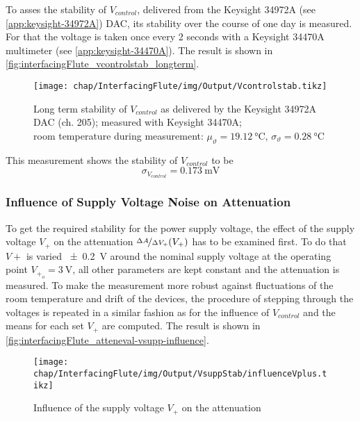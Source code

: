 To asses the stability of $V_{control}$, delivered from the Keysight 34972A (see \autoref{app:keysight-34972A}) DAC, its stability over the course of one day is measured. For that the voltage is taken once every 2 seconds with a Keysight 34470A multimeter (see \autoref{app:keysight-34470A}). The result is shown in \autoref{fig:interfacingFlute_vcontrolstab_longterm}.

\begin{figure}[tb]
	\centering
	\texttt{[image: chap/InterfacingFlute/img/Output/Vcontrolstab.tikz]}
	\caption{Long term stability of $V_{control}$ as delivered by the Keysight 34972A DAC (ch. 205); measured with Keysight 34470A;\\room temperature during measurement: $\mu_\vartheta=\SI{19.12}{\degreeCelsius}$, $\sigma_\vartheta=\SI{0.28}{\degreeCelsius}$}
	\label{fig:interfacingFlute_vcontrolstab_longterm}
\end{figure}

This measurement shows the stability of $V_{control}$ to be
\begin{equation}
\sigma_{V_{control}} = \SI{0.173}{\milli\volt}
\end{equation}

\subsubsection{Influence of Supply Voltage Noise on Attenuation}
To get the required stability for the power supply voltage, the effect of the supply voltage $V_+$ on the attenuation $\nicefrac{\Delta A}{\Delta V_+} (V_+)$ has to be examined first. To do that $V+$ is varied \SI{\pm0.2}{\volt} around the nominal supply voltage at the operating point $V_{+_o}=\SI{3}{\volt}$, all other parameters are kept constant and the attenuation is measured. To make the measurement more robust against fluctuations of the room temperature and drift of the devices, the procedure of stepping through the voltages is repeated in a similar fashion as for the influence of $V_{control}$ and the means for each set $V_+$ are computed. The result is shown in \autoref{fig:interfacingFlute_atteneval-vsupp-influence}.

\begin{figure}[tb]
	\centering
	\texttt{[image: chap/InterfacingFlute/img/Output/VsuppStab/influenceVplus.tikz]}
	\caption{Influence of the supply voltage $V_+$ on the attenuation}
	\label{fig:interfacingFlute_atteneval-vsupp-influence}
\end{figure}

